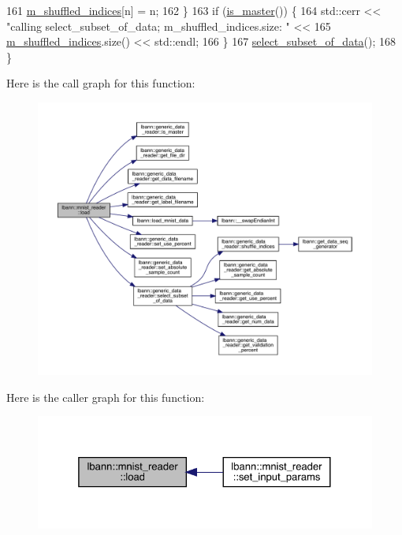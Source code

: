 \begin{DoxyCode}
161     \hyperlink{classlbann_1_1generic__data__reader_aaab6aeff67ffff1c689336851fec2c57}{m\_shuffled\_indices}[n] = n;
162   \}
163   \textcolor{keywordflow}{if} (\hyperlink{classlbann_1_1generic__data__reader_ae82c40eebc05e2f0c1198afcc7a7f009}{is\_master}()) \{
164     std::cerr << \textcolor{stringliteral}{"calling select\_subset\_of\_data; m\_shuffled\_indices.size: "} <<
165       \hyperlink{classlbann_1_1generic__data__reader_aaab6aeff67ffff1c689336851fec2c57}{m\_shuffled\_indices}.size() << std::endl;
166   \}
167   \hyperlink{classlbann_1_1generic__data__reader_aa28fdeeb6af492540f507e49adff5d6c}{select\_subset\_of\_data}();
168 \}
\end{DoxyCode}
Here is the call graph for this function\+:\nopagebreak
\begin{figure}[H]
\begin{center}
\leavevmode
\includegraphics[width=350pt]{classlbann_1_1mnist__reader_aacbd6c4dec95b9849083d96e0005b392_cgraph}
\end{center}
\end{figure}
Here is the caller graph for this function\+:\nopagebreak
\begin{figure}[H]
\begin{center}
\leavevmode
\includegraphics[width=325pt]{classlbann_1_1mnist__reader_aacbd6c4dec95b9849083d96e0005b392_icgraph}
\end{center}
\end{figure}
\mbox{\label{classlbann_1_1mnist__reader_aa9b6da319cff8e68aa91013ae250a014}} 
